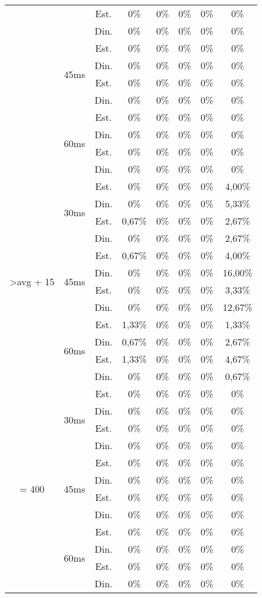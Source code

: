\begin{center}
\begin{longtable}{|c|c|c|ccccc|}
 &  & Est. &0\% &0\% &0\% &0\% &0\% \\
 &  & Din. &0\% &0\% &0\% &0\% &0\% \\ \cline{2-8} 
 & \multirow{4}{*}{45ms} & Est. &0\% &0\% &0\% &0\% &0\% \\
 &  & Din. &0\% &0\% &0\% &0\% &0\% \\
 &  & Est. &0\% &0\% &0\% &0\% &0\% \\
 &  & Din. &0\% &0\% &0\% &0\% &0\% \\ \cline{2-8} 
 & \multirow{4}{*}{60ms} & Est. &0\% &0\% &0\% &0\% &0\% \\
 &  & Din. &0\% &0\% &0\% &0\% &0\% \\
 &  & Est. &0\% &0\% &0\% &0\% &0\% \\
 &  & Din. &0\% &0\% &0\% &0\% &0\% \\ \hline
\multirow{12}{*}{\textgreater avg + 15} & \multirow{4}{*}{30ms} & Est. &0\% &0\% &0\% &0\% & 4,00\% \\
 &  & Din. &0\% &0\% &0\% &0\% & 5,33\% \\
 &  & Est. & 0,67\% &0\% &0\% &0\% & 2,67\% \\
 &  & Din. &0\% &0\% &0\% &0\% & 2,67\% \\ \cline{2-8} 
 & \multirow{4}{*}{45ms} & Est. & 0,67\% &0\% &0\% &0\% & 4,00\% \\
 &  & Din. &0\% &0\% &0\% &0\% & 16,00\% \\
 &  & Est. &0\% &0\% &0\% &0\% & 3,33\% \\
 &  & Din. &0\% &0\% &0\% &0\% & 12,67\% \\ \cline{2-8} 
 & \multirow{4}{*}{60ms} & Est. & 1,33\% &0\% &0\% &0\% & 1,33\% \\
 &  & Din. & 0,67\% &0\% &0\% &0\% & 2,67\% \\
 &  & Est. & 1,33\% &0\% &0\% &0\% & 4,67\% \\
 &  & Din. &0\% &0\% &0\% &0\% & 0,67\% \\ \hline
\multirow{12}{*}{= 400} & \multirow{4}{*}{30ms} & Est. &0\% &0\% &0\% &0\% &0\% \\
 &  & Din. &0\% &0\% &0\% &0\% &0\% \\
 &  & Est. &0\% &0\% &0\% &0\% &0\% \\
 &  & Din. &0\% &0\% &0\% &0\% &0\% \\ \cline{2-8} 
 & \multirow{4}{*}{45ms} & Est. &0\% &0\% &0\% &0\% &0\% \\
 &  & Din. &0\% &0\% &0\% &0\% &0\% \\
 &  & Est. &0\% &0\% &0\% &0\% &0\% \\
 &  & Din. &0\% &0\% &0\% &0\% &0\% \\ \cline{2-8} 
 & \multirow{4}{*}{60ms} & Est. &0\% &0\% &0\% &0\% &0\% \\
 &  & Din. &0\% &0\% &0\% &0\% &0\% \\
 &  & Est. &0\% &0\% &0\% &0\% &0\% \\
 &  & Din. &0\% &0\% &0\% &0\% &0\% \\ \hline
\end{longtable}
\end{center}

